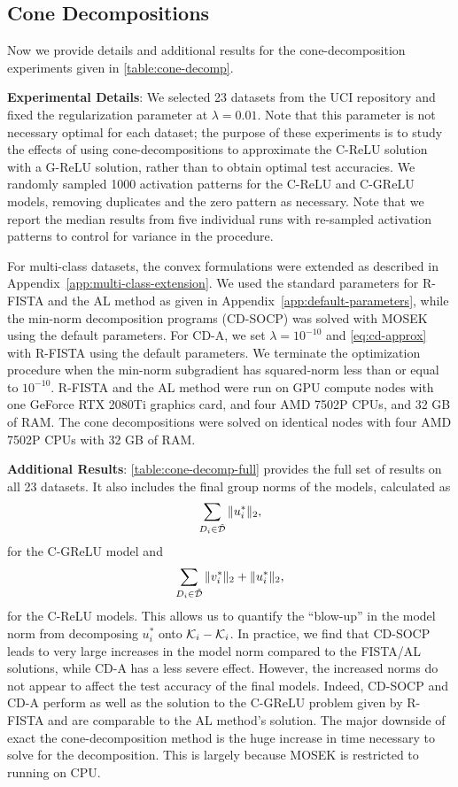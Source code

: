 
\subsection{Cone Decompositions}\label{app:cone-decomps}



Now we provide details and additional results for the cone-decomposition experiments given in \cref{table:cone-decomp}.

\textbf{Experimental Details}:
We selected 23 datasets from the UCI repository and fixed the regularization parameter at \( \lambda = 0.01 \).
Note that this parameter is not necessary optimal for each dataset;
the purpose of these experiments is to study the effects of using cone-decompositions to approximate the C-ReLU solution with a G-ReLU solution, rather than to obtain optimal test accuracies.
We randomly sampled 1000 activation patterns for the C-ReLU and C-GReLU models, removing duplicates and the zero pattern as necessary.
Note that we report the median results from five individual runs with re-sampled activation patterns to control for variance in the procedure.

For multi-class datasets, the convex formulations were extended as described in Appendix~\ref{app:multi-class-extension}.
We used the standard parameters for R-FISTA and the AL method as given in Appendix~\ref{app:default-parameters},
while the min-norm decomposition programs (CD-SOCP) was solved with MOSEK using the default parameters.
For CD-A, we set \( \lambda = 10^{-10} \) and \cref{eq:cd-approx} with R-FISTA
using the default parameters.
We terminate the optimization procedure when the min-norm subgradient has squared-norm
less than or equal to \( 10^{-10} \).
R-FISTA and the AL method were run on GPU compute nodes with one GeForce RTX 2080Ti graphics card, and four AMD 7502P CPUs, and 32 GB of RAM.
The cone decompositions were solved on identical nodes with four AMD 7502P CPUs with 32 GB of RAM.

\textbf{Additional Results}:
\cref{table:cone-decomp-full} provides the full set of results on all 23 datasets.
It also includes the final group norms of the models, calculated as
\[
	\sum_{D_i \in \tilde {\mathcal{D}}} \|u_i^*\|_2,
\]
for the C-GReLU model and
\[
	\sum_{D_i \in \tilde {\mathcal{D}}} \|v_i^*\|_2 + \|u_i^*\|_2,
\]
for the C-ReLU models.
This allows us to quantify the ``blow-up'' in the model norm from decomposing \( u_i^* \) onto \( \mathcal{K}_i - \mathcal{K}_i \).
In practice, we find that CD-SOCP leads to very large increases in the model norm compared to the FISTA/AL solutions, while CD-A has a less severe effect.
However, the increased norms do not appear to affect the test accuracy of the final models.
Indeed, CD-SOCP and CD-A perform as well as the solution to the C-GReLU problem given by R-FISTA and are comparable to the AL method's solution.
The major downside of exact the cone-decomposition method is the huge increase in time necessary to solve for the decomposition.
This is largely because MOSEK is restricted to running on CPU.

